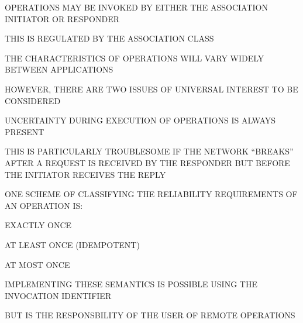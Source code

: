 \begin{bwslide}

\begin{nrtc}
\item	OPERATIONS MAY BE INVOKED BY EITHER THE ASSOCIATION INITIATOR OR RESPONDER
	\begin{nrtc}
	\item	THIS IS REGULATED BY THE ASSOCIATION CLASS
	\end{nrtc}
\end{nrtc}
\end{bwslide}


\begin{bwslide}

\begin{nrtc}
\item   THE CHARACTERISTICS OF OPERATIONS WILL VARY WIDELY BETWEEN APPLICATIONS

\item   HOWEVER, THERE ARE TWO ISSUES OF UNIVERSAL INTEREST TO BE CONSIDERED
\end{nrtc}
\end{bwslide}


\begin{bwslide}

\begin{nrtc}
\item   UNCERTAINTY DURING EXECUTION OF OPERATIONS IS ALWAYS PRESENT

\item   THIS IS PARTICULARLY TROUBLESOME IF THE NETWORK ``BREAKS''
        AFTER A REQUEST IS RECEIVED BY THE RESPONDER BUT BEFORE
        THE INITIATOR RECEIVES THE REPLY

\item   ONE SCHEME OF CLASSIFYING THE RELIABILITY REQUIREMENTS OF AN OPERATION
        IS:
    \begin{nrtc}
    \item       EXACTLY ONCE

    \item       AT LEAST ONCE (IDEMPOTENT)

    \item       AT MOST ONCE
    \end{nrtc}

\item   IMPLEMENTING THESE SEMANTICS IS POSSIBLE USING THE INVOCATION
        IDENTIFIER
    \begin{nrtc}
    \item       BUT IS THE RESPONSBILITY OF THE USER OF REMOTE OPERATIONS
    \end{nrtc}
\end{nrtc}
\end{bwslide}


